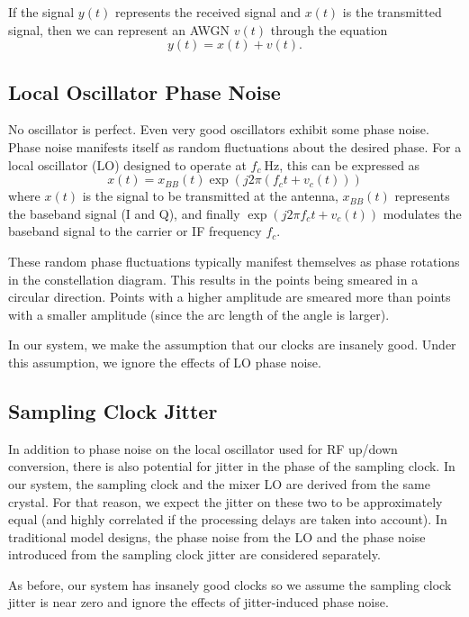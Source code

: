 \documentclass[conference]{IEEEtran}
\begin{document}
If the signal $y(t)$ represents the received signal and $x(t)$ is the transmitted
signal, then we can represent an AWGN $v(t)$ through the equation
\begin{equation}
y(t) = x(t) + v(t).
\end{equation}

\subsection*{Local Oscillator Phase Noise}
No oscillator is perfect. Even very good oscillators exhibit some phase noise.
Phase noise manifests itself as random fluctuations about the desired phase. For
a local oscillator (LO) designed to operate at $f_c\:\mbox{Hz}$, this can be
expressed as
\begin{equation}
x(t) = x_{BB}(t) \exp\left(j 2 \pi \left( f_c t + v_c(t) \right)\right)
\end{equation}
where $x(t)$ is the signal to be transmitted at the antenna, $x_{BB}(t)$
represents the baseband signal (I and Q), and finally
$\exp\left(j 2 \pi f_c t + v_c(t)\right)$ modulates the baseband signal
to the carrier or IF frequency $f_c$.

These random phase fluctuations typically manifest themselves as phase
rotations in the constellation diagram. This results in the points
being smeared in a circular direction. Points with a higher amplitude
are smeared more than points with a smaller amplitude (since the arc
length of the angle is larger).

In our system, we make the assumption that our clocks are insanely
good. Under this assumption, we ignore the effects of LO phase noise.

\subsection*{Sampling Clock Jitter}
In addition to phase noise on the local oscillator used for RF up/down
conversion, there is also potential for jitter in the phase of the
sampling clock. In our system, the sampling clock and the mixer LO
are derived from the same crystal. For that reason, we expect the
jitter on these two to be approximately equal (and highly correlated
if the processing delays are taken into account). In traditional
model designs, the phase noise from the LO and the phase noise
introduced from the sampling clock jitter are considered separately.

As before, our system has insanely good clocks so we assume the
sampling clock jitter is near zero and ignore the effects of jitter-induced
phase noise.
\end{document}
